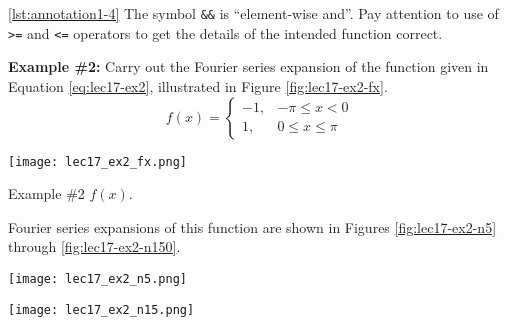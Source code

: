 \vspace{0.25cm}

\noindent \ref{lst:annotation1-4} The symbol \lstinline{&&} is ``element-wise and''.  Pay attention to use of \lstinline{>=} and \lstinline{<=} operators to get the details of the intended function correct.

\vspace{0.5cm}

\noindent\textbf{Example \#2:}  Carry out the Fourier series expansion of the function given in Equation \ref{eq:lec17-ex2}, illustrated in Figure \ref{fig:lec17-ex2-fx}.
\begin{equation}
f(x) = 
\begin{cases}
-1, & -\pi \le x < 0 \\
1, & 0 \le x \le \pi
\end{cases}
\label{eq:lec17-ex2}
\end{equation}
\begin{marginfigure}[-6.0cm]
\texttt{[image: lec17\_ex2\_fx.png]}
\caption{Example \#2 $f(x)$.}
\label{fig:lec17-ex2-fx}
\end{marginfigure}
Fourier series expansions of this function are shown in Figures \ref{fig:lec17-ex2-n5} through \ref{fig:lec17-ex2-n150}.
\begin{marginfigure}[-1.0cm]
\texttt{[image: lec17\_ex2\_n5.png]}
\caption{Fourier series expansion with \lstinline{n=5}.}
\label{fig:lec17-ex2-n5}
\end{marginfigure}

\begin{marginfigure}
\texttt{[image: lec17\_ex2\_n15.png]}
\caption{Fourier series expansion with \lstinline{n=15}.}
\label{fig:lec17-ex2-n15}
\end{marginfigure}


